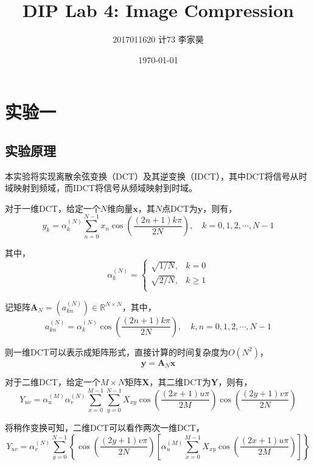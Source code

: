 \documentclass[12pt,a4paper]{article}
\title{DIP Lab 4: Image Compression}
\author{2017011620 \quad 计73 \quad 李家昊}
\date{\today}
\begin{document}
\maketitle

\section{实验一}

\subsection{实验原理}

本实验将实现离散余弦变换（DCT）及其逆变换（IDCT），其中DCT将信号从时域映射到频域，而IDCT将信号从频域映射到时域。

对于一维DCT，给定一个$N$维向量$\mathbf{x}$，其$N$点DCT为$\mathbf{y}$，则有，
\begin{equation}
    y_k = \alpha_k^{(N)} \sum_{n=0}^{N-1} x_n \cos\left(\frac{(2n+1)k\pi}{2N}\right), \quad k = 0,1,2,\cdots,N-1
\end{equation}

其中，
\begin{equation}
    \alpha_k^{(N)} = \begin{cases}
        \sqrt{1/N}, & k = 0 \\
        \sqrt{2/N}, & k \ge 1 \\
    \end{cases}
\end{equation}

记矩阵$\mathbf{A}_N = (a_{kn}^{(N)}) \in \mathbb{R}^{N \times N}$，其中，
\begin{equation}
    a_{kn}^{(N)} = \alpha_k^{(N)} \cos\left(\frac{(2n+1)k\pi}{2N}\right), \quad k,n = 0,1,2,\cdots,N-1
\end{equation}

则一维DCT可以表示成矩阵形式，直接计算的时间复杂度为$O(N^2)$，
\begin{equation}
    \mathbf{y} = \mathbf{A}_N \mathbf{x}
\end{equation}

对于二维DCT，给定一个$M\times N$矩阵$\mathbf{X}$，其二维DCT为$\mathbf{Y}$，则有，
\begin{equation}\label{eq:dct2d}
    Y_{uv} = \alpha_u^{(M)}\alpha_v^{(N)} \sum_{x=0}^{M-1} \sum_{y=0}^{N-1} X_{xy} \cos \left(\frac{(2x+1)u\pi}{2M}\right) \cos\left(\frac{(2y+1)v\pi}{2N}\right)
\end{equation}

将稍作变换可知，二维DCT可以看作两次一维DCT，
\begin{equation}\label{eq:dct1d1d}
    Y_{uv} = \alpha_v^{(N)} \sum_{y=0}^{N-1}\left\{\cos\left(\frac{(2y+1)v\pi}{2N}\right) \left[ \alpha_u^{(M)} \sum_{x=0}^{M-1} X_{xy} \cos \left(\frac{(2x+1)u\pi}{2M}\right) \right] \right\}
\end{equation}
\end{document}
